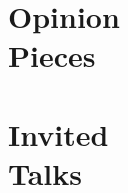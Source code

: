 \documentclass[margin,line]{resume}
\begin{document}
\begin{resume}
    \section{\mysidestyle Opinion\\Pieces}
    \begin{bibenum}
         \item {}
    \end{bibenum}

    \section{\mysidestyle Invited\\Talks}


\end{resume}
\end{document}
